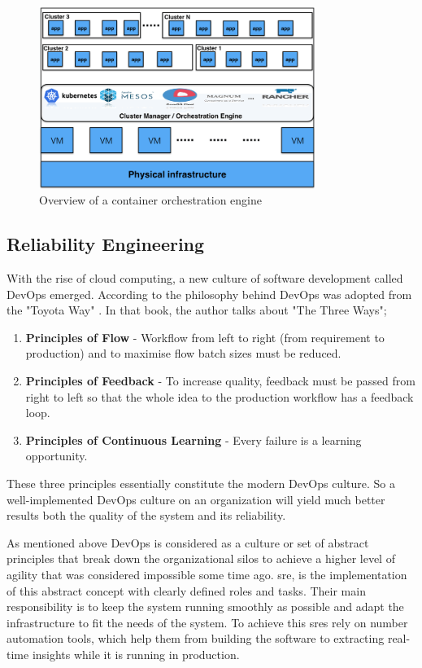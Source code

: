 \begin{figure}[H]
    \includegraphics[width=9cm]{assets/literature-review/Container-orchestration-engines.png}
    \caption{Overview of a container orchestration engine \citep{ElasticityCloudComputing}}
\end{figure}


\subsection{Reliability Engineering}

With the rise of cloud computing, a new culture of software development called DevOps emerged. According to \cite{kim2014phoenix} the philosophy behind DevOps was adopted from the "Toyota Way" \citep{liker2006toyota}. In that book, the author talks about "The Three Ways";
\begin{enumerate}
\item \textbf{Principles of Flow} - Workflow from left to right (from requirement to production) and to maximise flow batch sizes must be reduced.
\item \textbf{Principles of Feedback} - To increase quality, feedback must be passed from right to left so that the whole idea to the production workflow has a feedback loop. 
\item \textbf{Principles of Continuous Learning} - Every failure is a learning opportunity.
\end{enumerate}
These three principles essentially constitute the modern DevOps culture. So a well-implemented DevOps culture on an organization will yield much better results both the quality of the system and its reliability. 

As mentioned above DevOps is considered as a culture or set of abstract principles that break down the organizational silos to achieve a higher level of agility that was considered impossible some time ago. \ac{sre}, is the implementation of this abstract concept with clearly defined roles and tasks. Their main responsibility is to keep the system running smoothly as possible and adapt the infrastructure to fit the needs of the system. To achieve this \acp{sre} rely on number automation tools, which help them from building the software to extracting real-time insights while it is running in production.


